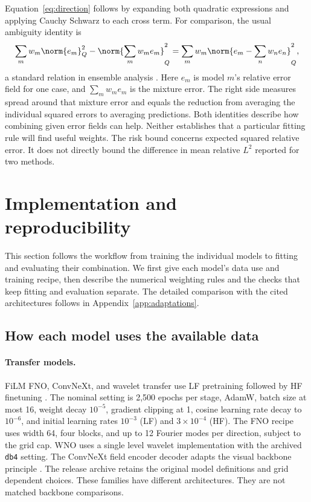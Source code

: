 Equation~\eqref{eq:direction} follows by expanding both quadratic expressions and applying
Cauchy Schwarz to each cross term. For comparison, the usual ambiguity identity is
\begin{equation}
 \sum_m w_m\norm{e_m}_Q^2-\norm{\sum_mw_me_m}_Q^2
 =\sum_m w_m\norm{e_m-\sum_nw_ne_n}_Q^2,
\end{equation}
a standard relation in ensemble analysis \citep{krogh1994}. Here $e_m$ is model
$m$'s relative error field for one case, and $\sum_mw_me_m$ is the mixture error.
The right side measures spread around that mixture error and equals the
reduction from averaging the individual squared errors to averaging predictions.
Both identities describe how combining given error fields can help.
Neither establishes that a particular fitting rule will find useful weights.
The risk bound concerns expected squared relative error. It does not directly
bound the difference in mean relative $L^2$ reported for two methods.

\section{Implementation and reproducibility}
\label{app:protocol}
This section follows the workflow from training the individual models to
fitting and evaluating their combination. We first give each model's data use
and training recipe, then describe the numerical weighting rules and the checks
that keep fitting and evaluation separate. The detailed comparison with
the cited architectures follows in Appendix~\ref{app:adaptations}.

\subsection{How each model uses the available data}
\label{app:experts}

\paragraph{Transfer models.}
FiLM FNO, ConvNeXt, and wavelet transfer use LF pretraining followed by HF finetuning
\citep{li2021fno,perez2018,liu2022convnext,tripura2022wno,lyu2023}.
The nominal setting is 2,500 epochs per stage, AdamW, batch size at most 16,
weight decay $10^{-5}$, gradient clipping at 1, cosine learning rate decay to $10^{-6}$,
and initial learning rates $10^{-3}$ (LF) and $3\times10^{-4}$ (HF).
The FNO recipe uses width 64, four blocks, and up to 12 Fourier modes per direction, subject
to the grid cap. WNO uses a single level wavelet implementation with the archived \texttt{db4}
setting. The ConvNeXt field encoder decoder adapts the visual backbone principle
\citep{liu2022convnext}. The release archive retains the original model definitions and grid dependent choices.
These families have different architectures. They are not matched backbone comparisons.

